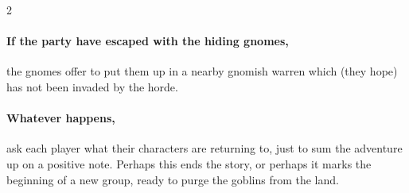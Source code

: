 \begin{multicols}{2}
{  \paragraph{If the party have escaped with the hiding gnomes,}
  the gnomes offer to put them up in a nearby gnomish \gls{warren} which (they hope) has not been invaded by the horde.

  \paragraph{Whatever happens,}
  ask each player what their characters are returning to, just to sum the adventure up on a positive note.
  Perhaps this ends the story, or perhaps it marks the beginning of a new group, ready to purge the goblins from the land.
}


\end{multicols}

